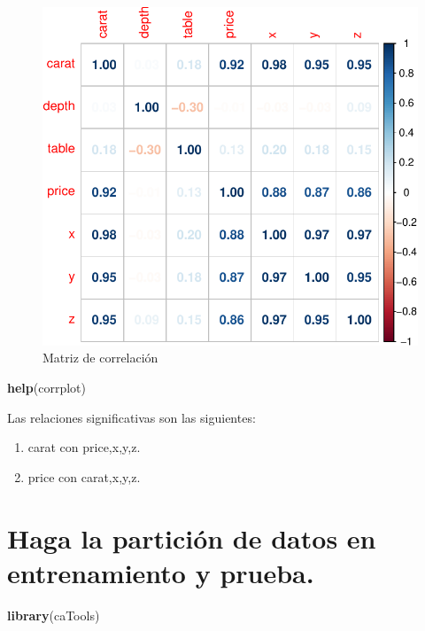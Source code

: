 \documentclass[
]{article}
\newenvironment{Shaded}{\begin{snugshade}}{\end{snugshade}}
\newcommand{\KeywordTok}[1]{\textcolor[rgb]{0.13,0.29,0.53}{\textbf{#1}}}
\newcommand{\NormalTok}[1]{#1}
\begin{document}
\begin{figure}[H]

{\centering \includegraphics[width=0.75\linewidth]{Lab4_files/figure-latex/unnamed-chunk-8-1} 

}

\caption{Matriz de correlación}\label{fig:unnamed-chunk-8}
\end{figure}

\begin{Shaded}
\begin{Highlighting}[]
\KeywordTok{help}\NormalTok{(corrplot)}
\end{Highlighting}
\end{Shaded}

Las relaciones significativas son las siguientes:

\begin{enumerate}
  \item carat con price,x,y,z. 
  \item price con carat,x,y,z.
\end{enumerate}

\hypertarget{haga-la-particiuxf3n-de-datos-en-entrenamiento-y-prueba.}{%
\section{Haga la partición de datos en entrenamiento y
prueba.}\label{haga-la-particiuxf3n-de-datos-en-entrenamiento-y-prueba.}}

\begin{Shaded}
\begin{Highlighting}[]
\KeywordTok{library}\NormalTok{(caTools)}
\end{Highlighting}
\end{Shaded}
\end{document}
